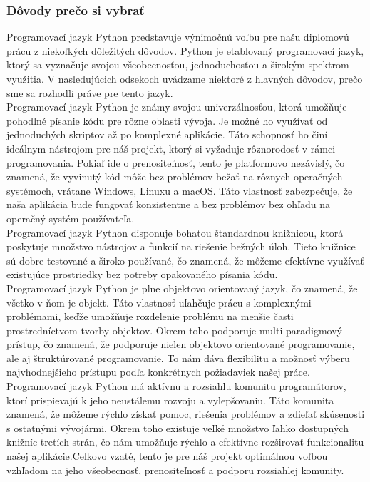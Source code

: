 \subsubsection{Dôvody prečo si vybrať}
\tab[5 mm] Programovací jazyk Python predstavuje výnimočnú voľbu pre našu diplomovú prácu z niekoľkých dôležitých dôvodov. Python je etablovaný programovací jazyk, ktorý sa vyznačuje svojou všeobecnosťou, jednoduchosťou a širokým spektrom využitia. V nasledujúcich odsekoch uvádzame niektoré z hlavných dôvodov, prečo sme sa rozhodli práve pre tento jazyk.\\
\tab[5 mm] Programovací jazyk Python je známy svojou univerzálnosťou, ktorá umožňuje pohodlné písanie kódu pre rôzne oblasti vývoja. Je možné ho využívať od jednoduchých skriptov až po komplexné aplikácie. Táto schopnosť ho činí ideálnym nástrojom pre náš projekt, ktorý si vyžaduje rôznorodosť v rámci programovania. Pokiaľ ide o prenositeľnosť, tento je platformovo nezávislý, čo znamená, že vyvinutý kód môže bez problémov bežať na rôznych operačných systémoch, vrátane Windows, Linuxu a macOS. Táto vlastnosť zabezpečuje, že naša aplikácia bude fungovať konzistentne a bez problémov bez ohľadu na operačný systém používateľa.\\
\tab[5 mm] Programovací jazyk Python disponuje bohatou štandardnou knižnicou, ktorá poskytuje množstvo nástrojov a funkcií na riešenie bežných úloh. Tieto knižnice sú dobre testované a široko používané, čo znamená, že môžeme efektívne využívať existujúce prostriedky bez potreby opakovaného písania kódu.\\
\tab[5 mm] Programovací jazyk Python je plne objektovo orientovaný jazyk, čo znamená, že všetko v ňom je objekt. Táto vlastnosť uľahčuje prácu s komplexnými problémami, keďže umožňuje rozdelenie problému na menšie časti prostredníctvom tvorby objektov. Okrem toho podporuje multi-paradigmový prístup, čo znamená, že podporuje nielen objektovo orientované programovanie, ale aj štruktúrované programovanie. To nám dáva flexibilitu a možnosť výberu najvhodnejšieho prístupu podľa konkrétnych požiadaviek našej práce.\\
\tab[5 mm] Programovací jazyk Python má aktívnu a rozsiahlu komunitu programátorov, ktorí prispievajú k jeho neustálemu rozvoju a vylepšovaniu. Táto komunita znamená, že môžeme rýchlo získať pomoc, riešenia problémov a zdieľať skúsenosti s ostatnými vývojármi. Okrem toho existuje veľké množstvo ľahko dostupných knižníc tretích strán, čo nám umožňuje rýchlo a efektívne rozširovať funkcionalitu našej aplikácie.Celkovo vzaté, tento je pre náš projekt optimálnou voľbou vzhľadom na jeho všeobecnosť, prenositeľnosť a podporu rozsiahlej komunity.
